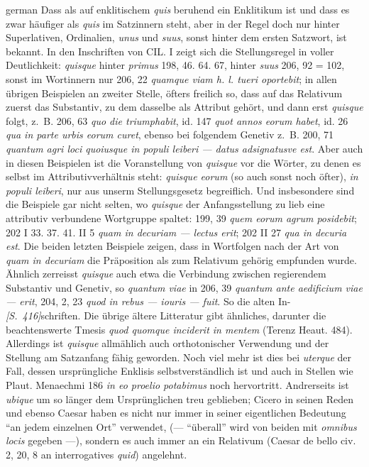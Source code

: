 \begin{otherlanguage*}{german}
Dass \emph{} als auf enklitischem \emph{quis} beruhend ein Enklitikum ist und dass es zwar häufiger als \emph{quis} im Satzinnern steht, aber in der Regel doch nur hinter Superlativen, Ordinalien, \emph{unus} und \emph{suus}, sonst hinter dem ersten Satzwort, ist bekannt. In den Inschriften von CIL. I zeigt sich die Stellungsregel in voller Deutlichkeit: \emph{quisque} hinter \emph{primus} 198, 46. 64. 67, hinter \emph{suus} 206, 92 = 102, sonst im Wortinnern nur 206, 22 \emph{quamque viam h. l.  tueri oportebit}; in allen übrigen Beispielen an zweiter Stelle, öfters freilich so, dass auf das Relativum zuerst das Substantiv, zu dem dasselbe als Attribut gehört, und dann erst \emph{quisque} folgt, z.~B. 206, 63 \emph{quo die  triumphabit}, id. 147 \emph{quot annos  eorum habet}, id. 26 \emph{qua in parte urbis  eorum curet}, ebenso bei folgendem Genetiv z.~B. 200, 71 \emph{quantum agri loci quoiusque in populi leiberi — datus adsignatusve est}. Aber auch in diesen Beispielen ist die Voranstellung von \emph{quisque} vor die Wörter, zu denen es selbst im Attributivverhältnis steht: \emph{quisque eorum} (so auch sonst noch öfter), \emph{ in populi leiberi}, nur aus unserm Stellungsgesetz begreiflich. Und insbesondere sind die Beispiele gar nicht selten, wo \emph{quisque} der Anfangsstellung zu lieb eine attributiv verbundene Wortgruppe spaltet: 199, 39 \emph{quem  eorum agrum posidebit}; 202 I 33. 37. 41. II 5 \emph{quam in  decuriam — lectus erit}; 202 II 27 \emph{qua in  decuria est}. Die beiden letzten Beispiele zeigen, dass in Wortfolgen nach der Art von \emph{quam in decuriam} die Präposition als zum Relativum gehörig empfunden wurde. Ähnlich zerreisst \emph{quis\-que} auch etwa die Verbindung zwischen regierendem Substantiv und Genetiv, so \emph{quantum viae} in 206, 39 \emph{quantum  ante aedificium viae — erit}, 204, 2, 23 \emph{quod  in rebus — iouris — fuit}. So die alten In-\hypertarget{p415}{\emph{[S.~416]}}\label{p416}schriften. Die übrige ältere Litteratur gibt ähnliches, darunter die beachtenswerte Tmesis \emph{quod  quomque inciderit in mentem} (Terenz Heaut. 484). Allerdings ist \emph{quisque} allmählich auch orthotonischer Verwendung und der Stellung am Satzanfang fähig geworden. Noch viel mehr ist dies bei \emph{uterque} der Fall, dessen ursprüngliche Enklisis selbstverständlich ist und auch in Stellen wie Plaut. Menaechmi 186 \emph{in eo  proelio potabimus} noch hervortritt. Andrerseits ist \emph{ubique} um so länger dem Ursprünglichen treu geblieben; Cicero in seinen Reden und ebenso Caesar haben es nicht nur immer in seiner eigentlichen Bedeutung “an jedem einzelnen Ort” verwendet, (— “überall” wird von beiden mit \emph{omnibus locis} gegeben —), sondern es auch immer an ein Relativum (Caesar de bello civ. 2, 20, 8 an interrogatives \emph{quid}) angelehnt.


\end{otherlanguage*}
